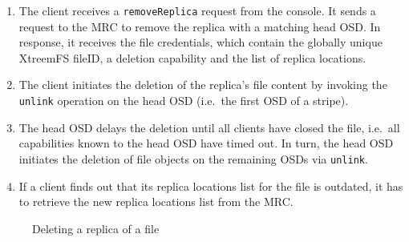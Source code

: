 \begin{enumerate}
 \item The client receives a \texttt{removeReplica} request from the console. It sends a request to the MRC to remove the replica with a matching head OSD. In response, it receives the file credentials, which contain the globally unique XtreemFS fileID, a deletion capability and the list of replica locations.
 \item The client initiates the deletion of the replica's file content by invoking the \texttt{unlink} operation on the head OSD (i.e.\ the first OSD of a stripe).
 \item The head OSD delays the deletion until all clients have closed the file, i.e.\ all capabilities known to the head OSD have timed out. In turn, the head OSD initiates the deletion of file objects on the remaining OSDs via \texttt{unlink}.
 \item If a client finds out that its replica locations list for the file is outdated, it has to retrieve the new replica locations list from the MRC.
\end{enumerate}

\begin{figure}[h!]
\centering
{}
\caption{Deleting a replica of a file}
\label{fig:interactions_rmrepl}
\end{figure}